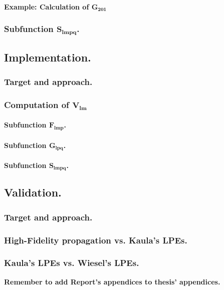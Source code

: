 		\paragraph{Example: Calculation of $\bm{G_{201}}$}
		\subsubsection{Subfunction $\bm{S_{lmpq}}$.}
	\subsection{Implementation.}
		\subsubsection{Target and approach.}
		\subsubsection{Computation of $\bm{V_{lm}}$}
			\paragraph{ Subfunction $\bm{F_{lmp}}$. }
			\paragraph{ Subfunction $\bm{ G_{lpq}}$. }
			\paragraph{ Subfunction $\bm{ S_{lmpq}}$. }
		\subsection{Validation.}
			\subsubsection{Target and approach.}
			\subsubsection{High-Fidelity propagation vs. Kaula's LPEs.}
			\subsubsection{Kaula's LPEs vs. Wiesel's LPEs.}
	\textbf{Remember to add Report's appendices to thesis' appendices.}